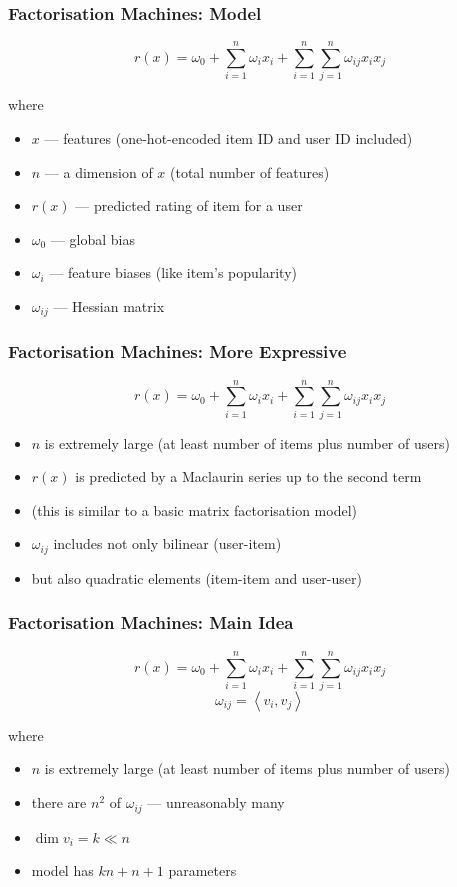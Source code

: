 \documentclass{beamer}
\begin{document}
\begin{frame}
  \frametitle{Factorisation Machines: Model}
  \begin{exampleblock}  {}$$r\left(x\right)=\omega_0+\sum\limits_{i=1}^n\omega_ix_i+\sum\limits_{i=1}^n\sum\limits_{j=1}^n\omega_{ij}x_ix_j$$
  \end{exampleblock}
  where
  \begin{itemize}
  \item $x$ --- features (one-hot-encoded item ID and user ID included)
  \item $n$ --- a dimension of $x$ (total number of features)
  \item $r\left(x\right)$ --- predicted rating of item for a user
  \item $\omega_0$ --- global bias
  \item $\omega_i$ --- feature biases (like item's popularity)
  \item $\omega_{ij}$ --- Hessian matrix
  \end{itemize}
\end{frame}
\begin{frame}
  \frametitle{Factorisation Machines: More Expressive}
  \begin{exampleblock}  {}$$r\left(x\right)=\omega_0+\sum\limits_{i=1}^n\omega_ix_i+\sum\limits_{i=1}^n\sum\limits_{j=1}^n\omega_{ij}x_ix_j$$
  \end{exampleblock}
  \begin{itemize}
  \item $n$ is extremely large (at least number of items plus number of users)
  \item $r\left(x\right)$ is predicted by a Maclaurin series up to the second term
  \item (this is similar to a basic matrix factorisation model)
  \item $\omega_{ij}$ includes not only bilinear (user-item)
  \item but also quadratic elements (item-item and user-user)
  \end{itemize}
\end{frame}
\begin{frame}
  \frametitle{Factorisation Machines: Main Idea}
  \begin{exampleblock}  {}$$r\left(x\right)=\omega_0+\sum\limits_{i=1}^n\omega_ix_i+\sum\limits_{i=1}^n\sum\limits_{j=1}^n\omega_{ij}x_ix_j$$
    $$\omega_{ij}=\left<v_i,v_j\right>$$
  \end{exampleblock}
  where
  \begin{itemize}
  \item $n$ is extremely large (at least number of items plus number of users)
  \item there are $n^2$ of $\omega_{ij}$ --- unreasonably many
  \item $\dim v_i=k\ll n$
  \item model has $kn + n + 1$ parameters
  \end{itemize}
\end{frame}
\end{document}
